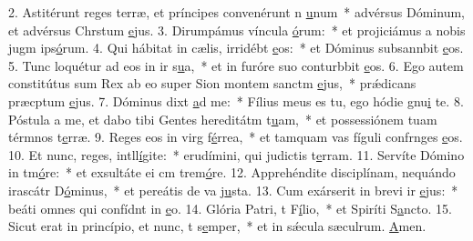 2. Astitérunt reges terræ, et príncipes convenérunt n \uline{u}num~* advérsus Dóminum, et advérsus Chrstum \uline{e}jus.
3. Dirumpámus víncula \uline{ó}rum:~* et projiciámus a nobis jugm ips\uline{ó}rum.
4. Qui hábitat in cælis, irridébt \uline{e}os:~* et Dóminus subsannbit \uline{e}os.
5. Tunc loquétur ad eos in ir s\uline{u}a,~* et in furóre suo conturbbit \uline{e}os.
6. Ego autem constitútus sum Rex ab eo super Sion montem sanctm \uline{e}jus,~* prǽdicans præcptum \uline{e}jus.
7. Dóminus dixt \uline{a}d me:~* Fílius meus es tu, ego hódie gnu\uline{i} te.
8. Póstula a me, et dabo tibi Gentes hereditátm t\uline{u}am,~* et possessiónem tuam térmnos t\uline{e}rræ.
9. Reges eos in virg f\uline{é}rrea,~* et tamquam vas fíguli confrnges \uline{e}os.
10. Et nunc, reges, intll\uline{í}gite:~* erudímini, qui judictis t\uline{e}rram.
11. Servíte Dómino in tm\uline{ó}re:~* et exsultáte ei cm trem\uline{ó}re.
12. Apprehéndite disciplínam, nequándo irascátr D\uline{ó}minus,~* et pereátis de va j\uline{u}sta.
13. Cum exárserit in brevi ir \uline{e}jus:~* beáti omnes qui confídnt in \uline{e}o.
14. Glória Patri, t F\uline{í}lio,~* et Spiríti S\uline{a}ncto.
15. Sicut erat in princípio, et nunc, t s\uline{e}mper,~* et in sǽcula sæculrum. \uline{A}men.
